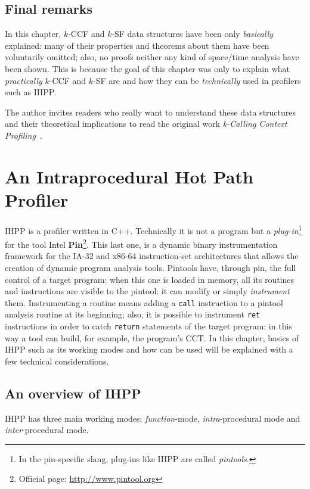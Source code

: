 \documentclass[a4paper,11pt]{report}
\begin{document}
\section{Final remarks}

In this chapter, $k$-CCF and $k$-SF data structures have been only \emph{basically} explained: many of their properties and theorems about them have been voluntarily omitted; 
also, no proofs neither any kind of space\slash time analysis have been shown.
This is because the goal of this chapter was only to explain what \emph{practically} $k$-CCF and $k$-SF are and how they can be \emph{technically} used in profilers such as IHPP. 

The author invites readers who really want to understand these data structures and their theoretical implications to read the original work \emph{k-Calling Context Profiling}~\cite{kccf}.


\chapter{An Intraprocedural Hot Path Profiler}

IHPP is a profiler written in C++. Technically it is not a program but
 a \emph{plug-in}\footnote{In the pin-specific slang,
plug-ins like IHPP are called \emph{pintools}.} for the tool 
Intel \textbf{Pin}\footnote{Official page: \url{http://www.pintool.org}}.
This last one, is a dynamic binary instrumentation framework for the IA-32 and x86-64 instruction-set architectures that allows the creation of dynamic program analysis tools. 
Pintools have, through pin, the full control of a target program: 
when this one is loaded in memory, all its routines and instructions are visible
to the pintool: it can modify or simply \emph{instrument} them. 
Instrumenting a routine means adding a \verb|call| instruction to a pintool analysis 
routine at its beginning; also, it is possible to instrument \verb|ret| instructions 
in order to catch \verb|return| statements of the target program: 
in this way a tool can build, for example, the program's CCT.
In this chapter, basics of IHPP such as its working modes and how can be used will be explained with a few technical considerations.

\section{An overview of IHPP}

IHPP has three main working modes: \emph{function}-mode, \emph{intra}-procedural mode and \emph{inter}-procedural mode. 
\end{document}
